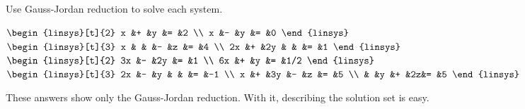 \begin{exercises}
   \recommended \item 
     Use Gauss-Jordan reduction to solve each system.
     \begin{exparts*}
        \partsitem \(
          \begin{linsys}[t]{2}
               x  &+  &y  &=  &2  \\
               x  &-  &y  &=  &0  
          \end{linsys}   \)
        \partsitem \(
          \begin{linsys}[t]{3}
               x  &   &   &-  &z  &=  &4  \\
              2x  &+  &2y &   &   &=  &1  
          \end{linsys}  \)
        \partsitem  \(
           \begin{linsys}[t]{2}
               3x  &-  &2y  &=  &1  \\
               6x  &+  &y   &=  &1/2 
           \end{linsys}  \)
        \partsitem \(
           \begin{linsys}[t]{3}
              2x  &-  &y  &  &  &= &-1  \\
               x  &+  &3y &- &z &= &5   \\
                  &   &y  &+ &2z&= &5   
           \end{linsys} \)
     \end{exparts*}
     \begin{answer}
       These answers show only the Gauss-Jordan reduction.
       With it, describing the solution set is easy. 
\end{answer}
\end{exercises}
